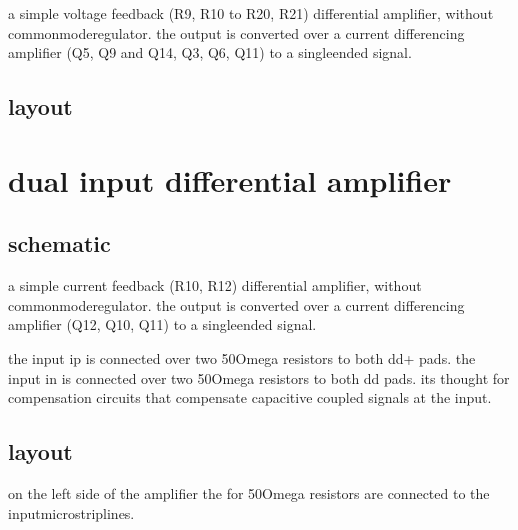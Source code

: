 \documentclass[letterpaper,10pt,english]{sphinxmanual}
\begin{document}
\sphinxAtStartPar
a simple voltage feedback (R9, R10 to R20, R21) differential amplifier, without common\sphinxhyphen{}mode\sphinxhyphen{}regulator. the output is converted over a current differencing amplifier (Q5, Q9 and Q14, Q3, Q6, Q11) to a single\sphinxhyphen{}ended signal.


\section{layout}
\label{\detokenize{amplifiers:id2}}


\chapter{dual input differential amplifier}
\label{\detokenize{amplifiers:dual-input-differential-amplifier}}

\section{schematic}
\label{\detokenize{amplifiers:id3}}

\sphinxAtStartPar
a simple current feedback (R10, R12) differential amplifier, without common\sphinxhyphen{}mode\sphinxhyphen{}regulator. the output is converted over a current differencing amplifier (Q12, Q10, Q11) to a single\sphinxhyphen{}ended signal.

\sphinxAtStartPar
the input ip is connected over two 50Omega resistors to both dd+ pads. the input in is connected over two 50Omega resistors to both dd\sphinxhyphen{} pads. its thought for compensation circuits that compensate capacitive coupled signals at the input.


\section{layout}
\label{\detokenize{amplifiers:id4}}

\sphinxAtStartPar
on the left side of the amplifier the for 50Omega resistors are connected to the input\sphinxhyphen{}microstriplines.
\end{document}
